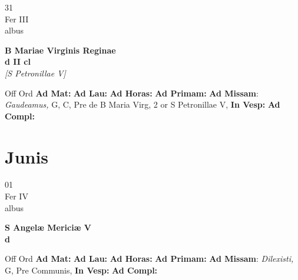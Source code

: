 \documentclass[10pt, openany]{book}
\begin{document}
    \begin{center}
        \begin{minipage}{3.5in}
            \vspace{2em}
            \begin{minipage}{0.5in}
                {\Huge 31} \\
                {\normalsize Fer III} \\
                {\normalsize albus}
            \end{minipage}
            \begin{minipage}{3.0in}
                \textbf{ \large B Mariae Virginis Reginae \\
                \textnormal{\normalsize d II cl}} \\ \textit{[S Petronillae V]} \\ 
            \end{minipage}
            \begin{justify}Off Ord
                \textbf{Ad Mat: }
                \textbf{Ad Lau: }
                \textbf{Ad Horas: }
                \textbf{Ad Primam: }\textbf{Ad Missam}: \textit{Gaudeamus,} G, C, Pre de B Maria Virg, 2 or S Petronillae V,  
                \textbf{In Vesp: }
                \textbf{Ad Compl: }
            \end{justify}
        \end{minipage}
    \end{center}

    \chapter{Junis}
                    
    \begin{center}
        \begin{minipage}{3.5in}
            \vspace{2em}
            \begin{minipage}{0.5in}
                {\Huge 01} \\
                {\normalsize Fer IV} \\
                {\normalsize albus}
            \end{minipage}
            \begin{minipage}{3.0in}
                \textbf{ \large S Angelæ Mericiæ V \\
                \textnormal{\normalsize d}} \\ 
            \end{minipage}
            \begin{justify}Off Ord
                \textbf{Ad Mat: }
                \textbf{Ad Lau: }
                \textbf{Ad Horas: }
                \textbf{Ad Primam: }\textbf{Ad Missam}: \textit{Dilexisti,} G, Pre Communis,  
                \textbf{In Vesp: }
                \textbf{Ad Compl: }
            \end{justify}
        \end{minipage}
    \end{center}
\end{document}
